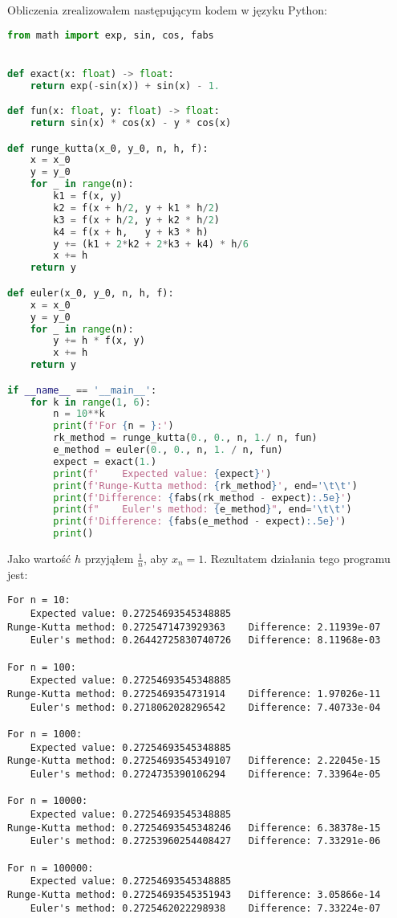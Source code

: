 \documentclass{article}
\begin{document}
\noindent
Obliczenia zrealizowałem następującym kodem w języku Python:
\begin{lstlisting}[language=Python]
from math import exp, sin, cos, fabs


def exact(x: float) -> float:
    return exp(-sin(x)) + sin(x) - 1.

def fun(x: float, y: float) -> float:
    return sin(x) * cos(x) - y * cos(x)

def runge_kutta(x_0, y_0, n, h, f):
    x = x_0
    y = y_0
    for _ in range(n):
        k1 = f(x, y)
        k2 = f(x + h/2, y + k1 * h/2)
        k3 = f(x + h/2, y + k2 * h/2)
        k4 = f(x + h,   y + k3 * h)
        y += (k1 + 2*k2 + 2*k3 + k4) * h/6
        x += h
    return y

def euler(x_0, y_0, n, h, f):
    x = x_0
    y = y_0
    for _ in range(n):
        y += h * f(x, y)
        x += h
    return y

if __name__ == '__main__':
    for k in range(1, 6):
        n = 10**k
        print(f'For {n = }:')
        rk_method = runge_kutta(0., 0., n, 1./ n, fun)
        e_method = euler(0., 0., n, 1. / n, fun)
        expect = exact(1.)
        print(f'    Expected value: {expect}')
        print(f'Runge-Kutta method: {rk_method}', end='\t\t')
        print(f'Difference: {fabs(rk_method - expect):.5e}')
        print(f"    Euler's method: {e_method}", end='\t\t')
        print(f'Difference: {fabs(e_method - expect):.5e}')
        print()
\end{lstlisting}

\noindent
Jako wartość \(h\) przyjąłem \(\frac{1}{n}\), aby \(x_n = 1\). Rezultatem działania tego programu jest:

\begin{verbatim}
For n = 10:
    Expected value: 0.27254693545348885
Runge-Kutta method: 0.2725471473929363    Difference: 2.11939e-07
    Euler's method: 0.26442725830740726	  Difference: 8.11968e-03

For n = 100:
    Expected value: 0.27254693545348885
Runge-Kutta method: 0.2725469354731914    Difference: 1.97026e-11
    Euler's method: 0.2718062028296542    Difference: 7.40733e-04

For n = 1000:
    Expected value: 0.27254693545348885
Runge-Kutta method: 0.27254693545349107	  Difference: 2.22045e-15
    Euler's method: 0.2724735390106294    Difference: 7.33964e-05

For n = 10000:
    Expected value: 0.27254693545348885
Runge-Kutta method: 0.27254693545348246	  Difference: 6.38378e-15
    Euler's method: 0.27253960254408427	  Difference: 7.33291e-06

For n = 100000:
    Expected value: 0.27254693545348885
Runge-Kutta method: 0.27254693545351943	  Difference: 3.05866e-14
    Euler's method: 0.2725462022298938    Difference: 7.33224e-07
\end{verbatim}
\end{document}
